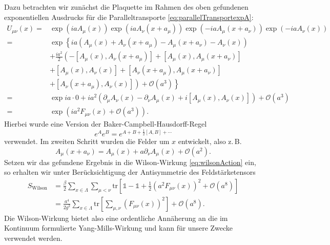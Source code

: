 Dazu betrachten wir zunächst die Plaquette im Rahmen des oben gefundenen
exponentiellen Ausdrucks für die Paralleltransporte \eqref{eq:parallelTransportexpA}:
\begin{align*}
    U_{\mu \nu}(x) =
    &\exp(i a A_\mu(x)) \exp(i a A_\nu(x + a_\mu))
    \exp(-i a A_\mu(x + a_\nu)) \exp(-i a A_\nu(x)) \\
    = &\exp \left\{ i a \left(A_\mu(x)
    + A_\nu(x + a_\mu) - A_\mu(x + a_\nu)
    - A_\nu(x) \right) \right. \\
    &+ \frac{i a^2}{2} \left(-[A_\mu(x), A_\nu(x + a_\mu)]
    + [A_\mu(x), A_\mu(x + a_\nu)] \right. \\
    &+ [A_\mu(x), A_\nu(x)] + [A_\nu(x + a_\mu), A_\mu(x + a_\nu)] \\
    &+ \left. \left. [A_\nu(x + a_\mu), A_\nu(x)] \right) + \mathcal{O}(a^3) \right\} \\
    = &\exp{i a \cdot 0 + i a^2 \left(\partial_\mu A_\nu(x)
    -\partial_\nu A_\mu(x) + i [A_\mu(x), A_\nu(x)] \right) + \mathcal{O}(a^3)} \\
    = &\exp(i a^2 F_{\mu \nu}(x) + \mathcal{O}(a^3)).
\end{align*}
Hierbei wurde eine Version der Baker-Campbell-Hausdorff-Regel \cite{gattringerLang}
\[
    e^A e^B = e^{A + B + \frac{1}{2} [A, B] + \cdots}
\]
verwendet. Im zweiten Schritt wurden die Felder um $x$ entwickelt, also z.\,B.
\[
    A_\mu(x + a_\nu) = A_\mu(x) + a \partial_\nu A_\mu(x) + \mathcal{O}(a^2).
\]
Setzen wir das gefundene Ergebnis in die Wilson-Wirkung
\eqref{eq:wilsonAction} ein, so erhalten wir unter Berücksichtigung der
Antisymmetrie des Feldstärketensors \cite{gattringerLang}
\begin{align*}
    S_\text{Wilson} &= \frac{\beta}{2} \sum_{x \in \Lambda} \sum_{\mu < \nu}
    \text{tr} \left[\mathds{1} - \mathds{1}
    + \frac{1}{2} (a^2 F_{\mu \nu}(x))^2
    + \mathcal{O}(a^8) \right] \\
    &= \frac{a^4}{2 g^2} \sum_{x \in \Lambda} \text{tr} \left[ \sum_{\mu, \nu}
    (F_{\mu \nu}(x))^2 \right] + \mathcal{O}(a^8).
\end{align*}
Die Wilson-Wirkung bietet also eine ordentliche Annäherung an die im Kontinuum
formulierte Yang-Mills-Wirkung und kann für unsere Zwecke verwendet werden.

